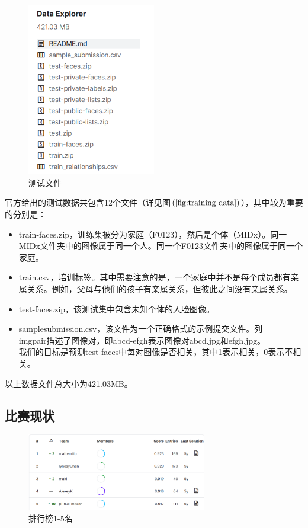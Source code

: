 \documentclass[UTF8]{ctexart}
\begin{document}
\begin{figure}[!ht]
  \centering
  \includegraphics[width=0.5\textwidth]{training data.jpg}
  \caption{测试文件}
  \label{fig:training data}
\end{figure}

官方给出的测试数据共包含12个文件（详见图$\left(\ref{fig:training data}\right)$），其中较为重要的分别是：
\begin{itemize}
  \item train-faces.zip，训练集被分为家庭（F0123），然后是个体（MIDx）。同一MIDx文件夹中的图像属于同一个人。同一个F0123文件夹中的图像属于同一个家庭。
  \item train.csv，培训标签。其中需要注意的是，一个家庭中并不是每个成员都有亲属关系。例如，父母与他们的孩子有亲属关系，但彼此之间没有亲属关系。
  \item test-faces.zip，该测试集中包含未知个体的人脸图像。
  \item sample\underline{\space}submission.csv，该文件为一个正确格式的示例提交文件。列\\
  img\underline{\space}pair描述了图像对，即abcd-efgh表示图像对abcd.jpg和efgh.jpg。\\
  我们的目标是预测test-faces中每对图像是否相关，其中1表示相关，0表示不相关。
\end{itemize}

以上数据文件总大小为421.03MB。

\subsection{比赛现状}

\begin{figure}[!ht]
  \centering
  \includegraphics[width=0.7\textwidth]{leaderboard.jpg}
  \caption{排行榜1-5名}
  \label{fig:leaderboard}
\end{figure}
\end{document}
